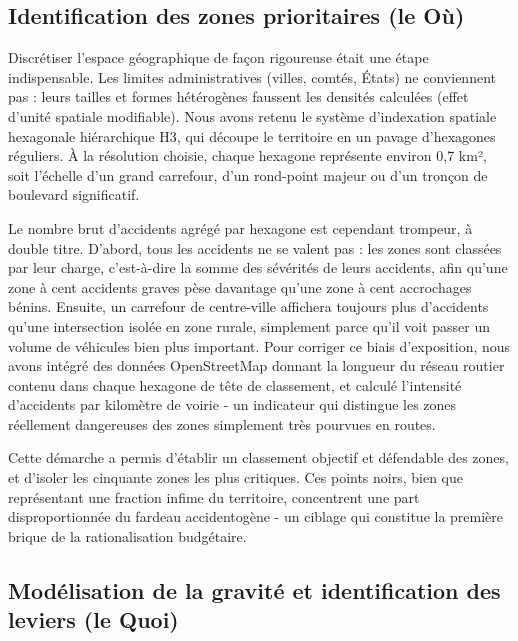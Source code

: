 \documentclass[12pt, a4paper]{article}
\begin{document}
\subsection{Identification des zones prioritaires (le Où)}

Discrétiser l'espace géographique de façon rigoureuse était une étape indispensable. Les limites administratives (villes, comtés, États) ne conviennent pas : leurs tailles et formes hétérogènes faussent les densités calculées (effet d'unité spatiale modifiable). Nous avons retenu le système d'indexation spatiale hexagonale hiérarchique H3, qui découpe le territoire en un pavage d'hexagones réguliers. À la résolution choisie, chaque hexagone représente environ 0,7 km², soit l'échelle d'un grand carrefour, d'un rond-point majeur ou d'un tronçon de boulevard significatif.

Le nombre brut d'accidents agrégé par hexagone est cependant trompeur, à double titre. D'abord, tous les accidents ne se valent pas : les zones sont classées par leur charge, c'est-à-dire la somme des sévérités de leurs accidents, afin qu'une zone à cent accidents graves pèse davantage qu'une zone à cent accrochages bénins. Ensuite, un carrefour de centre-ville affichera toujours plus d'accidents qu'une intersection isolée en zone rurale, simplement parce qu'il voit passer un volume de véhicules bien plus important. Pour corriger ce biais d'exposition, nous avons intégré des données OpenStreetMap donnant la longueur du réseau routier contenu dans chaque hexagone de tête de classement, et calculé l'intensité d'accidents par kilomètre de voirie - un indicateur qui distingue les zones réellement dangereuses des zones simplement très pourvues en routes.

Cette démarche a permis d'établir un classement objectif et défendable des zones, et d'isoler les cinquante zones les plus critiques. Ces points noirs, bien que représentant une fraction infime du territoire, concentrent une part disproportionnée du fardeau accidentogène - un ciblage qui constitue la première brique de la rationalisation budgétaire.

\subsection{Modélisation de la gravité et identification des leviers (le Quoi)}
\end{document}

